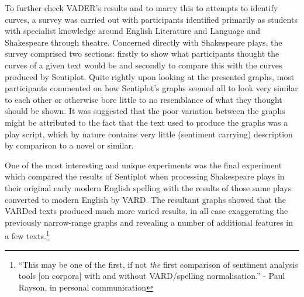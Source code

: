 \documentclass{article}
\begin{document}
    To further check VADER's results and to marry this to attempts to identify curves, a survey was carried out with participants identified primarily as students with specialist knowledge around English Literature and Language and Shakespeare through theatre. Concerned directly with Shakespeare plays, the survey comprised two sections: firstly to show what participants thought the curves of a given text would be and secondly to compare this with the curves produced by Sentiplot. Quite rightly upon looking at the presented graphs, most participants commented on how Sentiplot's graphs seemed all to look very similar to each other or otherwise bore little to no resemblance of what they thought should be shown. It was suggested that the poor variation between the graphs might be attributed to the fact that the text used to produce the graphs was a play script, which by nature contains very little (sentiment carrying) description by comparison to a novel or similar.

    One of the most interesting and unique experiments was the final experiment which compared the results of Sentiplot when processing Shakespeare plays in their original early modern English spelling with the results of those same plays converted to modern English by VARD. The resultant graphs showed that the VARDed texts produced much more varied results, in all case exaggerating the previously narrow-range graphs and revealing a number of additional features in a few texts.\footnote{``This may be one of the first, if not \textit{the} first comparison of sentiment analysis tools [on corpora] with and without VARD/spelling normalisation.'' - Paul Rayson, in personal communication}
\end{document}
